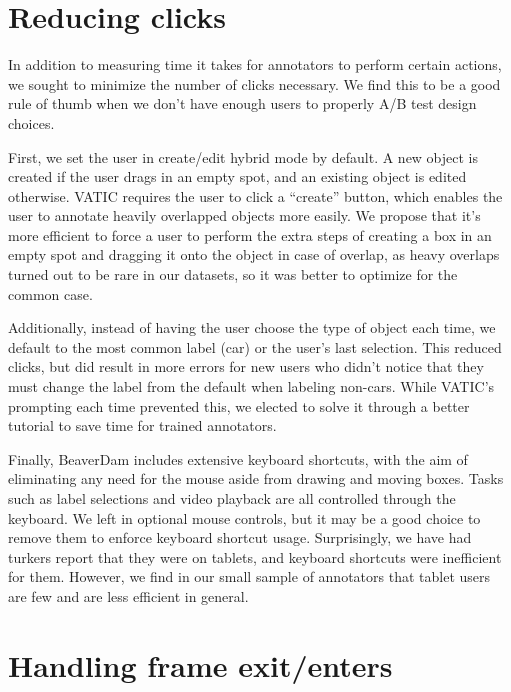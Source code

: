 \section{Reducing clicks}

In addition to measuring time it takes for annotators to perform certain actions, we sought to minimize the number of clicks necessary.
We find this to be a good rule of thumb when we don't have enough users to properly A/B test design choices.

First, we set the user in create/edit hybrid mode by default.
A new object is created if the user drags in an empty spot, and an existing object is edited otherwise.
VATIC requires the user to click a ``create'' button, which enables the user to annotate heavily overlapped objects more easily.
We propose that it's more efficient to force a user to perform the extra steps of creating a box in an empty spot and dragging it onto the object in case of overlap,
as heavy overlaps turned out to be rare in our datasets, so it was better to optimize for the common case.

Additionally, instead of having the user choose the type of object each time, we default to the most common label (car) or the user's last selection.
This reduced clicks, but did result in more errors for new users who didn't notice that they must change the label from the default when labeling non-cars.
While VATIC's prompting each time prevented this, we elected to solve it through a better tutorial to save time for trained annotators.

Finally, BeaverDam includes extensive keyboard shortcuts, with the aim of eliminating any need for the mouse aside from drawing and moving boxes. 
Tasks such as label selections and video playback are all controlled through the keyboard.
We left in optional mouse controls, but it may be a good choice to remove them to enforce keyboard shortcut usage.
Surprisingly, we have had turkers report that they were on tablets, and keyboard shortcuts were inefficient for them.
However, we find in our small sample of annotators that tablet users are few and are less efficient in general.

\section{Handling frame exit/enters}

